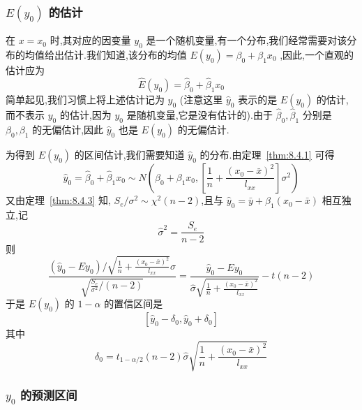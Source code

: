 \subsubsection{$E(y_0)$ 的估计}


在 $x=x_0$ 时,其对应的因变量 $y_0$ 是一个随机变量,有一个分布,我们经常需要对该分布的均值给出估计.我们知道,该分布的均值 $E(y_0)=\beta_0+\beta_1x_0$ ,因此,一个直观的估计应为
\begin{equation*}
\hat{E}(y_{0})=\hat{\beta}_0+\hat{\beta}_1 x_0
\end{equation*}
简单起见,我们习惯上将上述估计记为 $\hat{y}_0$ (注意这里 $\hat{y}_0$ 表示的是 $E(y_0)$ 的估计,而不表示 $y_0$ 的估计,因为 $y_0$ 是随机变量,它是没有估计的).由于 $\hat{\beta}_0,\hat{\beta}_1$ 分别是 $\beta_0,\beta_1$ 的无偏估计,因此 $\hat{y}_0$ 也是 $E(y_0)$ 的无偏估计.

为得到 $E(y_0)$ 的区间估计,我们需要知道 $\hat{y}_0$ 的分布.由定理~\ref{thm:8.4.1} 可得
\begin{equation*}
\hat{y}_{0}=\hat{\beta}_{0}+\hat{\beta}_{1} x_{0} \sim N\left(\beta_{0}+\beta_{1} x_{0},\left[\frac{1}{n}+\frac{\left(x_{0}-\bar{x}\right)^{2}}{l_{x x}}\right]\sigma^2\right)
\end{equation*}
又由定理~\ref{thm:8.4.3} 知, $S_{e} /\sigma^2 \sim \chi^{2}(n-2)$,且与 $\hat{y}_{0}=\bar{y}+\hat{\beta}_{1}\left(x_{0}-\bar{x}\right)$ 相互独立,记
\begin{equation*}
\hat{\sigma}^2=\frac{S_e}{n-2}
\end{equation*}
则
\begin{equation*}
\frac{\left(\hat{y}_{0}-E y_{0}\right) / \sqrt{\frac{1}{n}+\frac{\left(x_{0}-\bar{x}\right)^{2}}{l_{x x}}}\sigma }{\sqrt{\frac{S_{e}}{\sigma^{2}} /(n-2)}}=\frac{\hat{y}_{0}-E y_{0}}{\hat{\sigma} \sqrt{\frac{1}{n}+\frac{\left(x_{0}-\bar{x}\right)^{2}}{l_{x x}}}}-t(n-2)
\end{equation*}
于是 $E(y_0)$ 的 $1 - \alpha$ 的置信区间是
\begin{equation}\label{eq:8.4.20}
\left[ \hat{y}_0-\delta _0,\hat{y}_0+\delta _0 \right]
\end{equation}
其中
\begin{equation}
\delta_{0}=t_{1-\alpha / 2}(n-2) \hat{\sigma} \sqrt{\frac{1}{n}+\frac{\left(x_{0}-\bar{x}\right)^{2}}{l_{x x}}}\label{eq:8.4.21}
\end{equation}

\subsubsection{$y_0$ 的预测区间}

